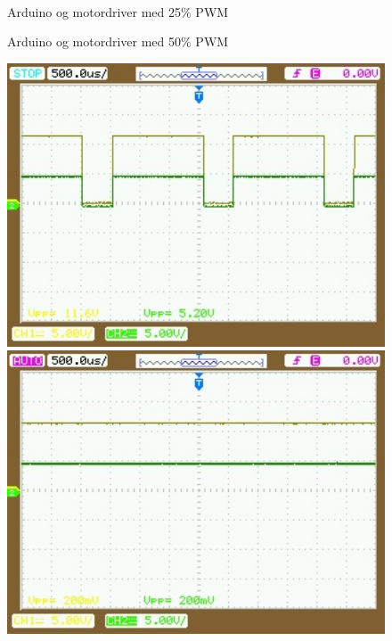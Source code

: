 \begin{figure}[htbp]
\begin{minipage}[b]{0.48\textwidth}
\end{minipage} \\ %
\begin{minipage}[t]{0.48\textwidth}
\caption{Arduino og motordriver med 25$\%$ PWM} %
\label{fig:25PWM}
\end{minipage} \hfill
\begin{minipage}[t]{0.48\textwidth}
\caption{Arduino og motordriver med 50$\%$ PWM} %
\label{fig:50PWM}
\end{minipage}
\end{figure}

 \begin{figure}[htbp] \centering
\begin{minipage}[b]{0.48\textwidth} \centering
\includegraphics[width=1.00\textwidth]{billeder/Hardware/motor75PWM.jpg} %
\end{minipage} \hfill
\begin{minipage}[b]{0.48\textwidth} \centering
\includegraphics[width=1.00\textwidth]{billeder/Hardware/motor100PWM.jpg} %

\end{minipage}
\end{figure}
